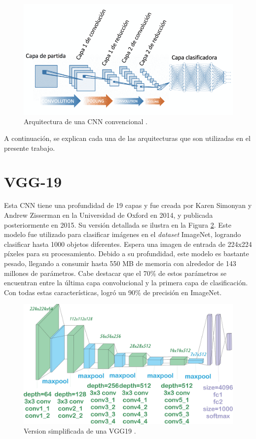 \begin{figure}[h!] 
    \includegraphics[width=1\textwidth]{images/CNN.png} 
    \centering 
    \caption{Arquitectura de una CNN convencional \protect\cite{CNN-Arquitectura}.} 
    \label{CNN} 
\end{figure}

A continuación, se explican cada una de las arquitecturas que 
son utilizadas en el presente trabajo. 

\section{VGG-19} 

Esta CNN tiene una profundidad de 19 capas y fue
creada por Karen Simonyan y Andrew Zisserman \cite{Simonyan2015}
en la Universidad de Oxford en 2014, y publicada posteriormente
en 2015. Su versión detallada se ilustra en la Figura \ref{VGG19}.
Este modelo fue utilizado para clasificar imágenes en el
\textit{dataset} ImageNet, logrando clasificar hasta 1000 objetos
diferentes. Espera una imagen de entrada de 224x224 píxeles para
su procesamiento. Debido a su profundidad, este modelo es bastante
pesado, llegando a consumir hasta 550 MB de memoria con alrededor
de 143 millones de parámetros. Cabe destacar que el 70\% de estos
parámetros se encuentran entre la última capa convolucional y la
primera capa de clasificación. Con todas estas características,
logró un 90\% de precisión en ImageNet.


\begin{figure}[h!] 
    \includegraphics[width=1\textwidth]{images/VGG19.jpeg} 
    \centering 
    \caption{Version simplificada de una VGG19 \protect\cite{modelos}.} 
    \label{VGG19} 
\end{figure}


